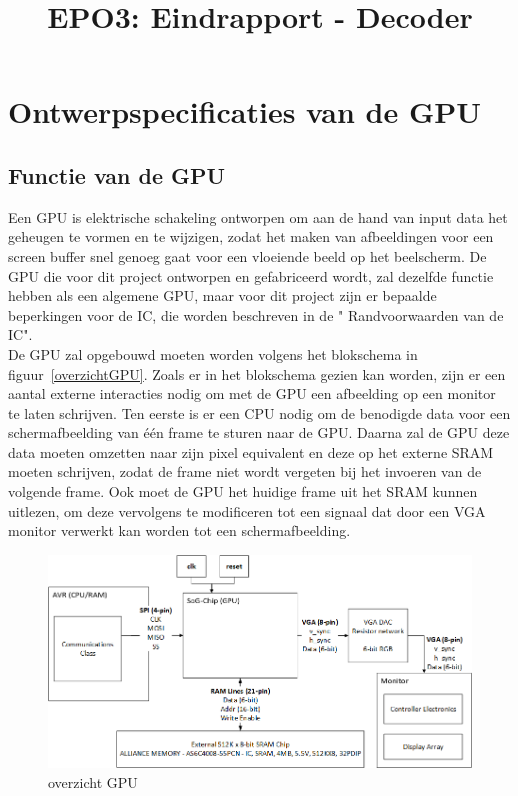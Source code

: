 \documentclass{scrartcl} %
\author{}
\title{EPO3: Eindrapport - Decoder}
\begin{document}
\chapter{Ontwerpspecificaties van de GPU}
\label{ch:spec}

\section {Functie van de GPU}
Een GPU is elektrische schakeling ontworpen om aan de hand van input data het geheugen te vormen en te wijzigen, zodat het maken van afbeeldingen voor een screen buffer snel genoeg gaat voor een vloeiende beeld op het beelscherm. De GPU die voor  dit project ontworpen en gefabriceerd wordt, zal dezelfde functie hebben als een algemene GPU, maar voor dit project zijn er bepaalde beperkingen voor de IC, die worden beschreven in de " Randvoorwaarden van de IC".
\\De GPU zal opgebouwd moeten worden volgens het blokschema in figuur~\ref{overzichtGPU}.
Zoals er in het blokschema gezien kan worden, zijn er een aantal externe interacties nodig om met de GPU een afbeelding op een monitor te laten schrijven. Ten eerste is er een CPU nodig om de benodigde data voor een schermafbeelding van één frame te sturen naar de GPU. Daarna zal de GPU deze data moeten omzetten naar zijn pixel equivalent en deze op het externe SRAM moeten schrijven, zodat de frame niet wordt vergeten bij het invoeren van de volgende frame. Ook moet de GPU het huidige frame uit het SRAM kunnen uitlezen, om deze vervolgens te modificeren tot een signaal dat door een VGA monitor verwerkt kan worden tot een schermafbeelding.

\begin{figure}[H]
\centering
        \includegraphics[scale=0.75, angle=90]{Resource/system_overview.png}
        \caption{overzicht GPU}
        \label{fig:overzichtGPU}
\end{figure} 
\end{document}
